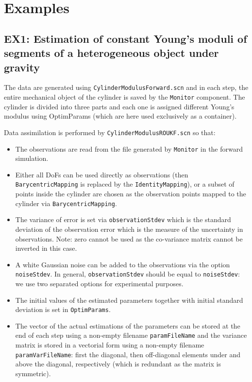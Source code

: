\documentclass[10pt]{article}
\begin{document}



\section{Examples}

\subsection{EX1: Estimation of constant Young's moduli of segments of a heterogeneous object under gravity}

The data are generated using \texttt{CylinderModulusForward.scn} and in each step, the entire mechanical object of the cylinder is saved by the
\texttt{Monitor} component.
The cylinder is divided into three parts and each one is assigned different Young's modulus using OptimParams  (which are here used exclusively as a
container).

Data assimilation is performed by \texttt{CylinderModulusROUKF.scn} so that:
\begin{itemize}
 \item The observations are read from the file generated by \texttt{Monitor} in the forward simulation. 
 \item Either all DoFs can be used directly as observations (then \texttt{BarycentricMapping} is replaced by the \texttt{IdentityMapping}), or 
 a subset of points inside the cylinder are chosen as the observation points mapped to the cylinder via \texttt{BarycentricMapping}.
 \item The variance of error is set via \texttt{observationStdev} which is the standard deviation of the observation error which is the measure of the
uncertainty in observations. Note: zero cannot be used as the co-variance matrix cannot be inverted in this case.
 \item A white Gaussian noise can be added to the observations via the option \texttt{noiseStdev}. In general, \texttt{observationStdev} should be
equal to \texttt{noiseStdev}: we use two separated options for experimental purposes.
 \item The initial values of the estimated parameters together with initial standard deviation is set in \texttt{OptimParams}.
 \item The vector of the actual estimations of the parameters can be stored at the end of each step using a non-empty filename \texttt{paramFileName}
and the variance matrix is stored in a vectorial 
 form using a non-empty filename \texttt{paramVarFileName}: first the diagonal, then off-diagonal elements under and above the diagonal, respectively
(which is redundant as the matrix is symmetric). 
 \end{itemize}
 
\end{document}
